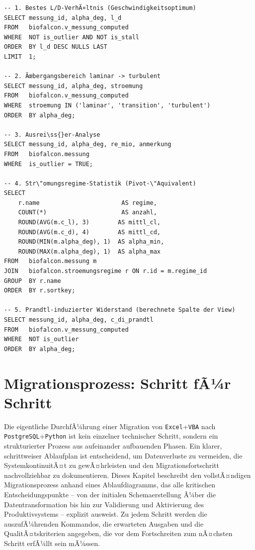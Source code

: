 ﻿\documentclass[12pt,a4paper]{report}
\theoremstyle{definition}
\theoremstyle{remark}
\newcommand{\excel}{\texttt{Excel}}
\newcommand{\vba}{\texttt{VBA}}
\newcommand{\pg}{\texttt{PostgreSQL}}
\newcommand{\py}{\texttt{Python}}
\begin{document}
\begin{lstlisting}[style=sql, caption={Analytische Abfragen gegen v\_messung\_computed}]
-- 1. Bestes L/D-VerhÃ¤ltnis (Geschwindigkeitsoptimum)
SELECT messung_id, alpha_deg, l_d
FROM   biofalcon.v_messung_computed
WHERE  NOT is_outlier AND NOT is_stall
ORDER  BY l_d DESC NULLS LAST
LIMIT  1;

-- 2. Ãœbergangsbereich laminar -> turbulent
SELECT messung_id, alpha_deg, stroemung
FROM   biofalcon.v_messung_computed
WHERE  stroemung IN ('laminar', 'transition', 'turbulent')
ORDER  BY alpha_deg;

-- 3. Ausrei\ss{}er-Analyse
SELECT messung_id, alpha_deg, re_mio, anmerkung
FROM   biofalcon.messung
WHERE  is_outlier = TRUE;

-- 4. Str\"omungsregime-Statistik (Pivot-\"Aquivalent)
SELECT
    r.name                       AS regime,
    COUNT(*)                     AS anzahl,
    ROUND(AVG(m.c_l), 3)        AS mittl_cl,
    ROUND(AVG(m.c_d), 4)        AS mittl_cd,
    ROUND(MIN(m.alpha_deg), 1)  AS alpha_min,
    ROUND(MAX(m.alpha_deg), 1)  AS alpha_max
FROM   biofalcon.messung m
JOIN   biofalcon.stroemungsregime r ON r.id = m.regime_id
GROUP  BY r.name
ORDER  BY r.sortkey;

-- 5. Prandtl-induzierter Widerstand (berechnete Spalte der View)
SELECT messung_id, alpha_deg, c_di_prandtl
FROM   biofalcon.v_messung_computed
WHERE  NOT is_outlier
ORDER  BY alpha_deg;
\end{lstlisting}

\chapter{Migrationsprozess: Schritt fÃ¼r Schritt}

Die eigentliche DurchfÃ¼hrung einer Migration von \excel{}+\vba{} nach \pg{}+\py{} ist kein einzelner technischer Schritt, sondern ein strukturierter Prozess aus aufeinander aufbauenden Phasen. Ein klarer, schrittweiser Ablaufplan ist entscheidend, um Datenverluste zu vermeiden, die SystemkontinuitÃ¤t zu gewÃ¤hrleisten und den Migrationsfortschritt nachvollziehbar zu dokumentieren. Dieses Kapitel beschreibt den vollstÃ¤ndigen Migrationsprozess anhand eines Ablaufdiagramms, das alle kritischen Entscheidungspunkte -- von der initialen Schemaerstellung Ã¼ber die Datentransformation bis hin zur Validierung und Aktivierung des Produktivsystems -- explizit ausweist. Zu jedem Schritt werden die auszufÃ¼hrenden Kommandos, die erwarteten Ausgaben und die QualitÃ¤tskriterien angegeben, die vor dem Fortschreiten zum nÃ¤chsten Schritt erfÃ¼llt sein mÃ¼ssen.
\end{document}
